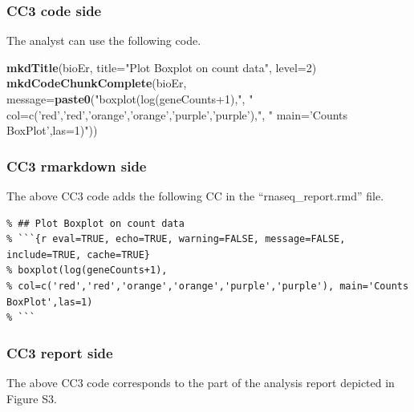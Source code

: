 \documentclass[]{article}
\newenvironment{Shaded}{\begin{snugshade}}{\end{snugshade}}
\newcommand{\DataTypeTok}[1]{\textcolor[rgb]{0.13,0.29,0.53}{#1}}
\newcommand{\DecValTok}[1]{\textcolor[rgb]{0.00,0.00,0.81}{#1}}
\newcommand{\KeywordTok}[1]{\textcolor[rgb]{0.13,0.29,0.53}{\textbf{#1}}}
\newcommand{\NormalTok}[1]{#1}
\newcommand{\StringTok}[1]{\textcolor[rgb]{0.31,0.60,0.02}{#1}}
\begin{document}
\hypertarget{cc3-code-side}{%
\subsubsection{CC3 code side}\label{cc3-code-side}}

The analyst can use the following code.

\begin{Shaded}
\begin{Highlighting}[]
\KeywordTok{mkdTitle}\NormalTok{(bioEr, }\DataTypeTok{title=}\StringTok{"Plot Boxplot on count data"}\NormalTok{, }\DataTypeTok{level=}\DecValTok{2}\NormalTok{)}
\KeywordTok{mkdCodeChunkComplete}\NormalTok{(bioEr, }\DataTypeTok{message=}\KeywordTok{paste0}\NormalTok{(}\StringTok{"boxplot(log(geneCounts+1),"}\NormalTok{,}
                        \StringTok{" col=c('red','red','orange','orange','purple','purple'),"}\NormalTok{, }
                        \StringTok{" main='Counts BoxPlot',las=1)"}\NormalTok{))}
\end{Highlighting}
\end{Shaded}

\hypertarget{cc3-rmarkdown-side}{%
\subsubsection{CC3 rmarkdown side}\label{cc3-rmarkdown-side}}

The above CC3 code adds the following CC in the ``rnaseq\_report.rmd''
file.

\begin{verbatim}
% ## Plot Boxplot on count data
% ```{r eval=TRUE, echo=TRUE, warning=FALSE, message=FALSE, include=TRUE, cache=TRUE}
% boxplot(log(geneCounts+1), 
% col=c('red','red','orange','orange','purple','purple'), main='Counts BoxPlot',las=1)
% ```
\end{verbatim}

\hypertarget{cc3-report-side}{%
\subsubsection{CC3 report side}\label{cc3-report-side}}

The above CC3 code corresponds to the part of the analysis report
depicted in Figure S3.
\end{document}
